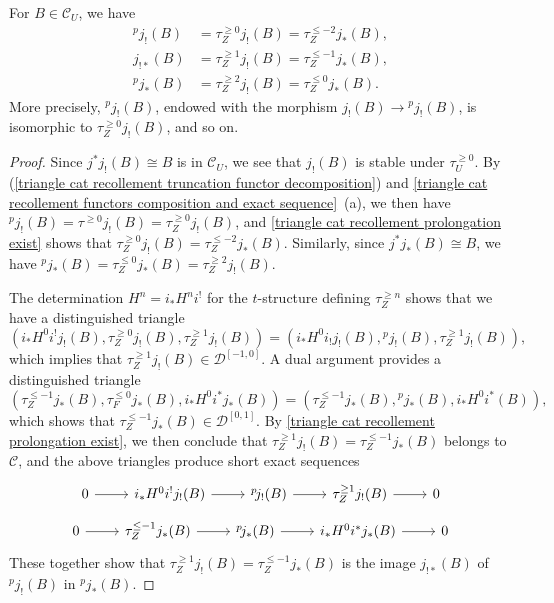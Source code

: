 \begin{proposition}\label{triangle cat recollement ^pj_! and ^pj_* is truncation}
For $B\in\mathcal{C}_U$, we have
\begin{align*}
{^p\!j_!}(B)&=\tau^{\geq 0}_Zj_!(B)=\tau^{\leq-2}_{Z}j_*(B),\\
j_{!*}(B)&=\tau^{\geq 1}_Zj_!(B)=\tau^{\leq-1}_Zj_*(B),\\
{^p\!j_*}(B)&=\tau^{\geq 2}_Zj_!(B)=\tau^{\leq 0}_Zj_*(B).
\end{align*}
More precisely, ${^p\!j_!}(B)$, endowed with the morphism $j_!(B)\to{^p\!j_!}(B)$, is isomorphic to $\tau^{\geq 0}_Zj_!(B)$, and so on.
\end{proposition}
\begin{proof}
Since $j^*j_!(B)\cong B$ is in $\mathcal{C}_U$, we see that $j_!(B)$ is stable under $\tau^{\geq 0}_U$. By (\ref{triangle cat recollement truncation functor decomposition}) and \cref{triangle cat recollement functors composition and exact sequence}~(a), we then have ${^p\!j_!}(B)=\tau^{\geq 0}j_!(B)=\tau^{\geq 0}_Zj_!(B)$, and \cref{triangle cat recollement prolongation exist} shows that $\tau^{\geq 0}_Zj_!(B)=\tau^{\leq -2}_Zj_*(B)$. Similarly, since $j^*j_*(B)\cong B$, we have ${^p\!j_*}(B)=\tau^{\leq 0}_Zj_*(B)=\tau^{\geq 2}_Zj_!(B)$.\par
The determination $H^n=i_*H^ni^!$ for the $t$-structure defining $\tau^{\geq n}_Z$ shows that we have a distinguished triangle
\[(i_*H^0i^!j_!(B),\tau^{\geq 0}_Zj_!(B),\tau^{\geq 1}_Zj_!(B))=(i_*H^0i_!j_!(B),{^p\!j_!}(B),\tau^{\geq 1}_Zj_!(B)),\]
which implies that $\tau_Z^{\geq 1}j_!(B)\in\mathcal{D}^{[-1,0]}$. A dual argument provides a distinguished triangle
\[(\tau^{\leq -1}_Zj_*(B),\tau^{\leq 0}_Fj_*(B),i_*H^0i^*j_*(B))=(\tau^{\leq -1}_Zj_*(B),{^p\!j_*}(B),i_*H^0i^*(B)),\]
which shows that $\tau^{\leq -1}_Zj_*(B)\in\mathcal{D}^{[0,1]}$. By \cref{triangle cat recollement prolongation exist}, we then conclude that $\tau^{\geq 1}_Zj_!(B)=\tau^{\leq -1}_Zj_*(B)$ belongs to $\mathcal{C}$, and the above triangles produce short exact sequences
\[\begin{tikzcd}
0\ar[r]&i_*H^0i^!j_!(B)\ar[r]&{^p\!j_!}(B)\ar[r]&\tau^{\geq 1}_Zj_!(B)\ar[r]&0
\end{tikzcd}\]
\vspace*{-4mm}
\[\begin{tikzcd}
0\ar[r]&\tau_Z^{\leq -1}j_*(B)\ar[r]&{^p\!j_*}(B)\ar[r]&i_*H^0i^*j_*(B)\ar[r]&0
\end{tikzcd}\]
These together show that $\tau^{\geq 1}_Zj_!(B)=\tau^{\leq -1}_Zj_*(B)$ is the image $j_{!*}(B)$ of ${^p\!j_!}(B)$ in ${^p\!j_*}(B)$.
\end{proof}

